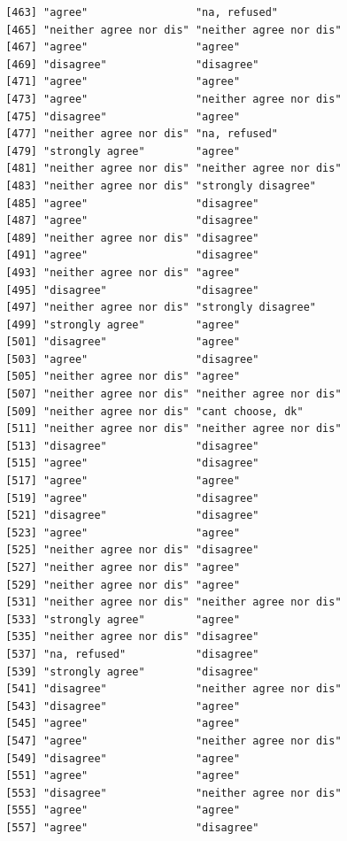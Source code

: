 \documentclass{beamer}\usepackage[]{graphicx}\usepackage[]{color}
\makeatletter
\newenvironment{kframe}{%
 \def\at@end@of@kframe{}%
 \ifinner\ifhmode%
  \def\at@end@of@kframe{\end{minipage}}%
  \begin{minipage}{\columnwidth}%
 \fi\fi%
 \def\FrameCommand##1{\hskip\@totalleftmargin \hskip-\fboxsep
 \colorbox{shadecolor}{##1}\hskip-\fboxsep
     \hskip-\linewidth \hskip-\@totalleftmargin \hskip\columnwidth}%
 \MakeFramed {\advance\hsize-\width
   \@totalleftmargin\z@ \linewidth\hsize
   \@setminipage}}%
 {\par\unskip\endMakeFramed%
 \at@end@of@kframe}
\newenvironment{knitrout}{}{} %
\makeatother
\begin{document}
\begin{frame}[fragile]
\begin{knitrout}
\begin{kframe}
\begin{verbatim}
 [463] "agree"                 "na, refused"          
 [465] "neither agree nor dis" "neither agree nor dis"
 [467] "agree"                 "agree"                
 [469] "disagree"              "disagree"             
 [471] "agree"                 "agree"                
 [473] "agree"                 "neither agree nor dis"
 [475] "disagree"              "agree"                
 [477] "neither agree nor dis" "na, refused"          
 [479] "strongly agree"        "agree"                
 [481] "neither agree nor dis" "neither agree nor dis"
 [483] "neither agree nor dis" "strongly disagree"    
 [485] "agree"                 "disagree"             
 [487] "agree"                 "disagree"             
 [489] "neither agree nor dis" "disagree"             
 [491] "agree"                 "disagree"             
 [493] "neither agree nor dis" "agree"                
 [495] "disagree"              "disagree"             
 [497] "neither agree nor dis" "strongly disagree"    
 [499] "strongly agree"        "agree"                
 [501] "disagree"              "agree"                
 [503] "agree"                 "disagree"             
 [505] "neither agree nor dis" "agree"                
 [507] "neither agree nor dis" "neither agree nor dis"
 [509] "neither agree nor dis" "cant choose, dk"      
 [511] "neither agree nor dis" "neither agree nor dis"
 [513] "disagree"              "disagree"             
 [515] "agree"                 "disagree"             
 [517] "agree"                 "agree"                
 [519] "agree"                 "disagree"             
 [521] "disagree"              "disagree"             
 [523] "agree"                 "agree"                
 [525] "neither agree nor dis" "disagree"             
 [527] "neither agree nor dis" "agree"                
 [529] "neither agree nor dis" "agree"                
 [531] "neither agree nor dis" "neither agree nor dis"
 [533] "strongly agree"        "agree"                
 [535] "neither agree nor dis" "disagree"             
 [537] "na, refused"           "disagree"             
 [539] "strongly agree"        "disagree"             
 [541] "disagree"              "neither agree nor dis"
 [543] "disagree"              "agree"                
 [545] "agree"                 "agree"                
 [547] "agree"                 "neither agree nor dis"
 [549] "disagree"              "agree"                
 [551] "agree"                 "agree"                
 [553] "disagree"              "neither agree nor dis"
 [555] "agree"                 "agree"                
 [557] "agree"                 "disagree"             

\end{verbatim}
\end{kframe}
\end{knitrout}
\end{frame}
\end{document}
